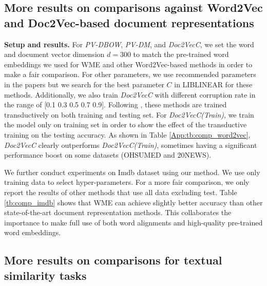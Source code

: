 \documentclass[11pt,a4paper]{article}
\newcommand{\1}{\boldsymbol{1}}
\begin{document}
\subsection{More results on comparisons against Word2Vec and Doc2Vec-based document representations}
\label{App:More Results on Comparisons against Word2Vec and Doc2Vec-based document representations}

\textbf{Setup and results.} For \emph{PV-DBOW}, \emph{PV-DM}, and \emph{Doc2VecC}, we set the word and document vector dimension $d=300$ to match the pre-trained word embeddings we used for WME and other Word2Vec-based methods in order to make a fair comparison. For other parameters, we use recommended parameters in the papers but we search for the best parameter $C$ in LIBLINEAR for these methods. Additionally, we also train \emph{Doc2VecC} with different corruption rate in the range of [0.1 0.3 0.5 0.7 0.9]. Following \cite{Chen2017efficient}, these methods are trained transductively on both training and testing set. For \emph{Doc2VecC(Train)}, we train the model only on training set in order to show the effect of the transductive training on the testing accuracy. As shown in Table \ref{App:tb:comp_word2vec}, \emph{Doc2VecC} clearly outperforms \emph{Doc2VecC(Train)}, sometimes having a significant performance boost on some datasets (OHSUMED and 20NEWS).

We further conduct experiments on Imdb dataset using our method. We use only training data to select hyper-parameters. For a more fair comparison, we only report the results of other methods that use all data excluding test. Table \ref{tb:comp_imdb} shows that WME can achieve slightly better accuracy than other state-of-the-art document representation methods. This collaborates the importance to make full use of both word alignments and high-quality pre-trained word embeddings. 


\subsection{More results on comparisons for textual similarity tasks}
\label{App:More results on comparisons for textual similarity tasks}
\end{document}
